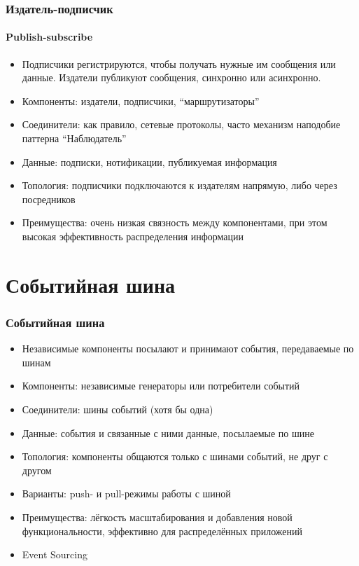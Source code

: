 \documentclass{../cscslides}
\begin{document}
    \begin{frame}
        \frametitle{Издатель-подписчик}
        \framesubtitle{Publish-subscribe}
        \begin{itemize}
            \item Подписчики регистрируются, чтобы получать нужные им сообщения или данные. Издатели публикуют сообщения, синхронно или асинхронно.
            \item Компоненты: издатели, подписчики, ``маршрутизаторы''
            \item Соединители: как правило, сетевые протоколы, часто механизм наподобие паттерна ``Наблюдатель''
            \item Данные: подписки, нотификации, публикуемая информация
            \item Топология: подписчики подключаются к издателям напрямую, либо через посредников
            \item Преимущества: очень низкая связность между компонентами, при этом высокая эффективность распределения информации
        \end{itemize}
    \end{frame}

    \section{Событийная шина}

    \begin{frame}
        \frametitle{Событийная шина}
        \begin{itemize}
            \item Независимые компоненты посылают и принимают события, передаваемые по шинам
            \item Компоненты: независимые генераторы или потребители событий
            \item Соединители: шины событий (хотя бы одна)
            \item Данные: события и связанные с ними данные, посылаемые по шине
            \item Топология: компоненты общаются только с шинами событий, не друг с другом
            \item Варианты: push- и pull-режимы работы с шиной
            \item Преимущества: лёгкость масштабирования и добавления новой функциональности, эффективно для распределённых приложений
            \item Event Sourcing
        \end{itemize}
    \end{frame}
\end{document}
